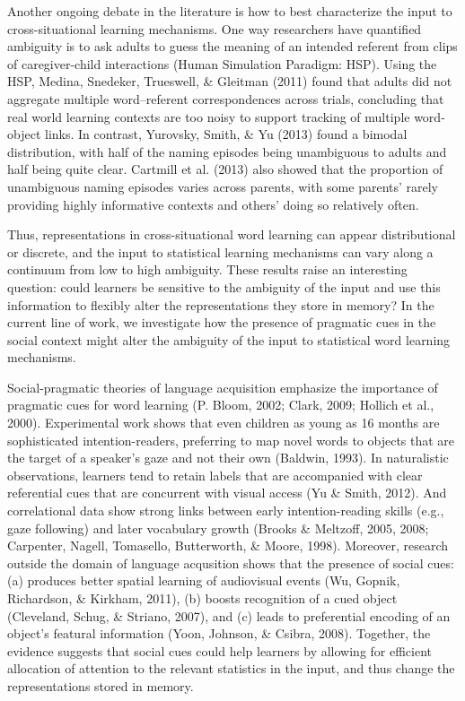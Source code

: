 \documentclass[authoryear, review]{elsarticle}
\begin{document}
Another ongoing debate in the literature is how to best characterize the
input to cross-situational learning mechanisms. One way researchers have
quantified ambiguity is to ask adults to guess the meaning of an
intended referent from clips of caregiver-child interactions (Human
Simulation Paradigm: HSP). Using the HSP, Medina, Snedeker, Trueswell,
\& Gleitman (2011) found that adults did not aggregate multiple
word--referent correspondences across trials, concluding that real world
learning contexts are too noisy to support tracking of multiple
word-object links. In contrast, Yurovsky, Smith, \& Yu (2013) found a
bimodal distribution, with half of the naming episodes being unambiguous
to adults and half being quite clear. Cartmill et al. (2013) also showed
that the proportion of unambiguous naming episodes varies across
parents, with some parents' rarely providing highly informative contexts
and others' doing so relatively often.

Thus, representations in cross-situational word learning can appear
distributional or discrete, and the input to statistical learning
mechanisms can vary along a continuum from low to high ambiguity. These
results raise an interesting question: could learners be sensitive to
the ambiguity of the input and use this information to flexibly alter
the representations they store in memory? In the current line of work,
we investigate how the presence of pragmatic cues in the social context
might alter the ambiguity of the input to statistical word learning
mechanisms.

Social-pragmatic theories of language acquisition emphasize the
importance of pragmatic cues for word learning (P. Bloom, 2002; Clark,
2009; Hollich et al., 2000). Experimental work shows that even children
as young as 16 months are sophisticated intention-readers, preferring to
map novel words to objects that are the target of a speaker's gaze and
not their own (Baldwin, 1993). In naturalistic observations, learners
tend to retain labels that are accompanied with clear referential cues
that are concurrent with visual access (Yu \& Smith, 2012). And
correlational data show strong links between early intention-reading
skills (e.g., gaze following) and later vocabulary growth (Brooks \&
Meltzoff, 2005, 2008; Carpenter, Nagell, Tomasello, Butterworth, \&
Moore, 1998). Moreover, research outside the domain of language
acqusition shows that the presence of social cues: (a) produces better
spatial learning of audiovisual events (Wu, Gopnik, Richardson, \&
Kirkham, 2011), (b) boosts recognition of a cued object (Cleveland,
Schug, \& Striano, 2007), and (c) leads to preferential encoding of an
object's featural information (Yoon, Johnson, \& Csibra, 2008).
Together, the evidence suggests that social cues could help learners by
allowing for efficient allocation of attention to the relevant
statistics in the input, and thus change the representations stored in
memory.
\end{document}
